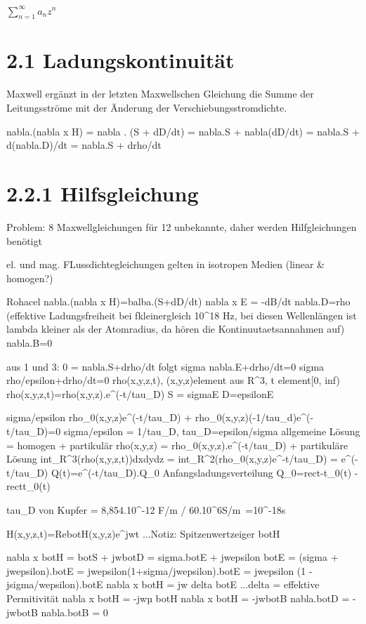 \documentclass[a4paper]{article}
\begin{document}
$\sum_{n=1}^{\infty} a_n z^n$
\section{2.1 Ladungskontinuität}

Maxwell ergänzt in der letzten Maxwellschen Gleichung die Summe der Leitungsströme mit der Änderung der Verschiebungsstromdichte.

nabla.(nabla x H) = nabla . (S + dD/dt)
= nabla.S + nabla(dD/dt)
= nabla.S + d(nabla.D)/dt
= nabla.S + drho/dt

\section{2.2.1 Hilfsgleichung}
Problem: 8 Maxwellgleichungen für 12 unbekannte, daher werden Hilfgleichungen benötigt

el. und mag. FLussdichtegleichungen gelten in isotropen Medien (linear & homogen?)

Rohacel
nabla.(nabla x H)=balba.(S+dD/dt)
nabla x E = -dB/dt
nabla.D=rho (effektive Ladungsfreiheit bei fkleinergleich 10^18 Hz, bei diesen Wellenlängen ist lambda kleiner als der Atomradius, da hören die Kontinuutaetsannahmen auf)
nabla.B=0

aus 1 und 3:
0 = nabla.S+drho/dt folgt sigma nabla.E+drho/dt=0
                           sigma rho/epsilon+drho/dt=0
                                rho(x,y,z,t), (x,y,z)element aus R^3, t element[0, inf)
                                rho(x,y,z,t)=rho(x,y,z).e^(-t/tau_D)
S = sigmaE
D=epsilonE

sigma/epsilon rho_0(x,y,z)e^(-t/tau_D) + rho_0(x,y,z)(-1/tau_d)e^(-t/tau_D)=0
sigma/epsilon = 1/tau_D, tau_D=epsilon/sigma
allgemeine Lösung = homogen + partikulär
rho(x,y,z) = rho_0(x,y,z).e^(-t/tau_D) + partikuläre Lösung
int_R^3(rho(x,y,z,t))dxdydz = int_R^2(rho_0(x,y,z)e^-t/tau_D)
                            = e^(-t/tau_D)
                            Q(t)=e^(-t/tau_D).Q_0
Anfangsladungsverteilung
Q_0=rect-t_0(t) - rectt_0(t)

tau_D von Kupfer = 8,854.10^-12 F/m / 60.10^6S/m~=10^-18s

H(x,y,z,t)=Re{botH(x,y,z)e^jwt} ...Notiz: Spitzenwertzeiger botH

nabla x botH = botS + jwbotD = sigma.botE + jwepsilon botE = (sigma + jwepsilon).botE = jwepsilon(1+sigma/jwepsilon).botE = jwepsilon (1 - jsigma/wepsilon).botE
        nabla x botH = jw delta botE   ...delta = effektive Permitivität
        nabla x botH = -jwµ botH
nabla x botH = -jwbotB
nabla.botD = -jwbotB
nabla.botB = 0
\end{document}
